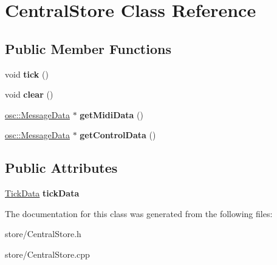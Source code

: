 \hypertarget{classCentralStore}{}\section{Central\+Store Class Reference}
\label{classCentralStore}
\subsection*{Public Member Functions}
\begin{DoxyCompactItemize}
\item 
void {\bfseries tick} ()\hypertarget{classCentralStore_ab809e0f4e90d4d8d1873a89f3da889b3}{}\label{classCentralStore_ab809e0f4e90d4d8d1873a89f3da889b3}

\item 
void {\bfseries clear} ()\hypertarget{classCentralStore_a100ae6ad2506d4962d23966e23a1c78e}{}\label{classCentralStore_a100ae6ad2506d4962d23966e23a1c78e}

\item 
\hyperlink{classosc_1_1MessageData}{osc\+::\+Message\+Data} $\ast$ {\bfseries get\+Midi\+Data} ()\hypertarget{classCentralStore_a910470f5eec98b92b82a4cb2f1c5f386}{}\label{classCentralStore_a910470f5eec98b92b82a4cb2f1c5f386}

\item 
\hyperlink{classosc_1_1MessageData}{osc\+::\+Message\+Data} $\ast$ {\bfseries get\+Control\+Data} ()\hypertarget{classCentralStore_a3faaea58a012d25efaa710fa3d1942b7}{}\label{classCentralStore_a3faaea58a012d25efaa710fa3d1942b7}

\end{DoxyCompactItemize}
\subsection*{Public Attributes}
\begin{DoxyCompactItemize}
\item 
\hyperlink{structTickData}{Tick\+Data} {\bfseries tick\+Data}\hypertarget{classCentralStore_a6f0c4050f0983924bbad8c631746f8b7}{}\label{classCentralStore_a6f0c4050f0983924bbad8c631746f8b7}

\end{DoxyCompactItemize}


The documentation for this class was generated from the following files\+:\begin{DoxyCompactItemize}
\item 
store/Central\+Store.\+h\item 
store/Central\+Store.\+cpp\end{DoxyCompactItemize}

